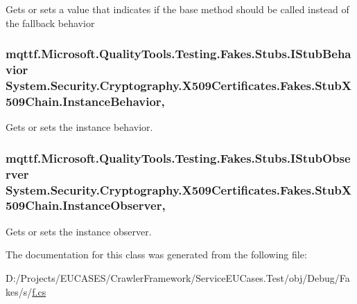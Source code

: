 Gets or sets a value that indicates if the base method should be called instead of the fallback behavior

\hypertarget{class_system_1_1_security_1_1_cryptography_1_1_x509_certificates_1_1_fakes_1_1_stub_x509_chain_abdaed235d5ae4e733a4f562a16aeae53}{
\subsubsection[{Instance\-Behavior}]{\setlength{\rightskip}{0pt plus 5cm}mqttf.\-Microsoft.\-Quality\-Tools.\-Testing.\-Fakes.\-Stubs.\-I\-Stub\-Behavior System.\-Security.\-Cryptography.\-X509\-Certificates.\-Fakes.\-Stub\-X509\-Chain.\-Instance\-Behavior\hspace{0.3cm}{\ttfamily [get]}, {\ttfamily [set]}}}\label{class_system_1_1_security_1_1_cryptography_1_1_x509_certificates_1_1_fakes_1_1_stub_x509_chain_abdaed235d5ae4e733a4f562a16aeae53}


Gets or sets the instance behavior.

\hypertarget{class_system_1_1_security_1_1_cryptography_1_1_x509_certificates_1_1_fakes_1_1_stub_x509_chain_a0d9780ed31fb7043ff2498ee56985c8a}{
\subsubsection[{Instance\-Observer}]{\setlength{\rightskip}{0pt plus 5cm}mqttf.\-Microsoft.\-Quality\-Tools.\-Testing.\-Fakes.\-Stubs.\-I\-Stub\-Observer System.\-Security.\-Cryptography.\-X509\-Certificates.\-Fakes.\-Stub\-X509\-Chain.\-Instance\-Observer\hspace{0.3cm}{\ttfamily [get]}, {\ttfamily [set]}}}\label{class_system_1_1_security_1_1_cryptography_1_1_x509_certificates_1_1_fakes_1_1_stub_x509_chain_a0d9780ed31fb7043ff2498ee56985c8a}


Gets or sets the instance observer.



The documentation for this class was generated from the following file\-:\begin{DoxyCompactItemize}
\item 
D\-:/\-Projects/\-E\-U\-C\-A\-S\-E\-S/\-Crawler\-Framework/\-Service\-E\-U\-Cases.\-Test/obj/\-Debug/\-Fakes/s/\hyperlink{s_2f_8cs}{f.\-cs}\end{DoxyCompactItemize}
